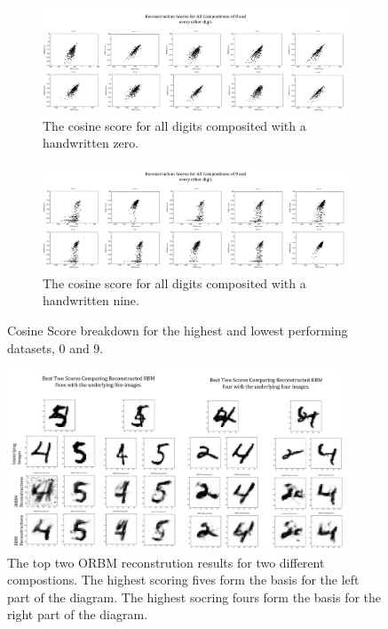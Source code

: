 \begin{figure}[h]
    \centering
    \begin{subfigure}[t]{1\textwidth}
        \includegraphics[width=\textwidth]{Assets/b.png}
        \caption{The cosine score for all digits composited with a handwritten zero.  }
      \label{F:Cosine-0-x-scores}
    \end{subfigure}
    \begin{subfigure}[t]{1\textwidth}
        \includegraphics[width=\textwidth]{Assets/(9,X)-ReconstructionScores.png}
        \caption{The cosine score for all digits composited with a handwritten nine.  }
      \label{F:Cosine-9-x-scores}
    \end{subfigure}
    \caption{Cosine Score breakdown for the highest and lowest performing datasets, 0 and 9.}\label{fig:mnist-worse-best-results}
\end{figure}

\begin{figure}[htb]
  \begin{center}
    \includegraphics[width=0.9\textwidth]{Assets/results/orbm-Best-2-results.png}
  \end{center}
  \caption{The top two ORBM reconstrution results for two different compostions. The highest scoring fives form the basis for the left part of the diagram. The highest socring fours form the basis for the right part of the diagram.}
  \label{F:Best-Results-MNIST}
\end{figure}

